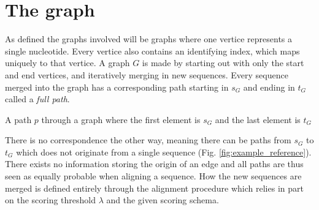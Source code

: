\documentclass{article}
\begin{document}
\section{The graph}
As defined the graphs involved will be graphs where one vertice represents a single nucleotide. Every vertice also contains an identifying index, which maps uniquely to that vertice. A graph $G$ is made by starting out with only the start and end vertices, and iteratively merging in new sequences. Every sequence merged into the graph has a corresponding path starting in $s_G$ and ending in $t_G$ called a \textit{full path}. 
\begin{defn}
  A path $p$ through a graph where the first element is $s_G$ and the last element is $t_G$
\end{defn}
\noindent
There is no correspondence the other way, meaning there can be paths from $s_G$ to $t_G$ which does not originate from a single sequence (Fig. \ref{fig:example_reference}). There exists no information storing the origin of an edge and all paths are thus seen as equally probable when aligning a sequence. How the new sequences are merged is defined entirely through the alignment procedure which relies in part on the scoring threshold $\lambda$ and the given scoring schema.
\clearpage
\end{document}
